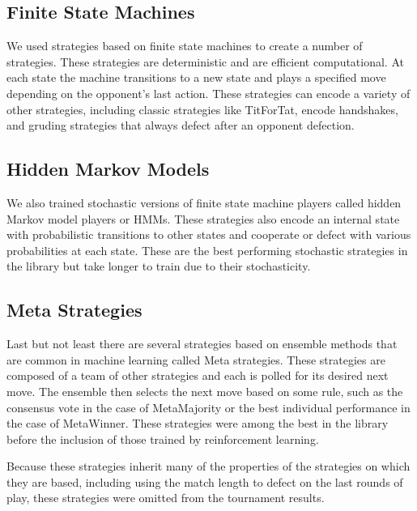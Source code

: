 \documentclass{article}
\begin{document}

\subsection{Finite State Machines}

We used strategies based on finite state machines to create a number of
strategies. These strategies are deterministic and are efficient computational.
At each state the machine transitions to a new state and plays a specified move
depending on the opponent's last action. These strategies can encode a variety
of other strategies, including classic strategies like TitForTat, encode
handshakes, and gruding strategies that always defect after an opponent
defection.


\subsection{Hidden Markov Models}

We also trained stochastic versions of finite state machine players called
hidden Markov model players or HMMs. These strategies also encode an internal
state with probabilistic transitions to other states and cooperate or defect
with various probabilities at each state. These are the best performing
stochastic strategies in the library but take longer to train due to their
stochasticity.

\subsection{Meta Strategies}

Last but not least there are several strategies based on ensemble methods that
are common in machine learning called Meta strategies. These strategies are
composed of a team of other strategies and each is polled for its desired next
move. The ensemble then selects the next move based on some rule, such as the
consensus vote in the case of MetaMajority or the best individual performance
in the case of MetaWinner. These strategies were among the best in the library
before the inclusion of those trained by reinforcement learning.

Because these strategies inherit many of the properties of the strategies
on which they are based, including using the match length to defect on the last
rounds of play, these strategies were omitted from the tournament results.
\end{document}
